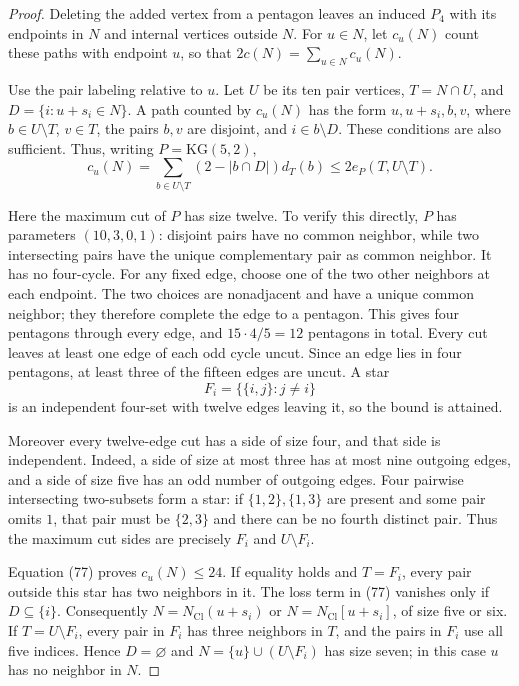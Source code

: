 \begin{proof}
Deleting the added vertex from a pentagon leaves an induced $P_4$ with
its endpoints in $N$ and internal vertices outside $N$. For $u\in N$,
let $c_u(N)$ count these paths with endpoint $u$, so that
$2c(N)=\sum_{u\in N}c_u(N)$.

Use the pair labeling relative to $u$. Let $U$ be its ten pair vertices,
$T=N\cap U$, and $D=\{i:u+s_i\in N\}$. A path counted by $c_u(N)$
has the form $u,u+s_i,b,v$, where $b\in U\setminus T$, $v\in T$, the
pairs $b,v$ are disjoint, and $i\in b\setminus D$. These conditions
are also sufficient. Thus, writing $P=\mathrm{KG}(5,2)$,
\begin{equation}\tag{77}\label{eq:neighborhood-path-count}
 c_u(N)=\sum_{b\in U\setminus T}(2-|b\cap D|)d_T(b)
   \leq2e_P(T,U\setminus T).
\end{equation}

Here the maximum cut of $P$ has size twelve. To verify this directly,
$P$ has parameters $(10,3,0,1)$: disjoint pairs have no common
neighbor, while two intersecting pairs have the unique complementary
pair as common neighbor. It has no four-cycle. For any fixed edge,
choose one of the two other neighbors at each endpoint. The two choices
are nonadjacent and have a unique common neighbor; they therefore
complete the edge to a pentagon. This gives four pentagons through
every edge, and $15\cdot4/5=12$ pentagons in total. Every cut leaves
at least one edge of each odd cycle uncut. Since an edge lies in four
pentagons, at least three of the fifteen edges are uncut. A star
\[
 F_i=\{\{i,j\}:j\ne i\}
\]
is an independent four-set with twelve edges leaving it, so the bound
is attained.

Moreover every twelve-edge cut has a side of size four, and that side
is independent. Indeed, a side of size at most three has at most nine
outgoing edges, and a side of size five has an odd number of outgoing
edges. Four pairwise intersecting two-subsets form a star: if
$\{1,2\},\{1,3\}$ are present and some pair omits $1$, that pair must
be $\{2,3\}$ and there can be no fourth distinct pair. Thus the
maximum cut sides are precisely $F_i$ and $U\setminus F_i$.

Equation (77) proves $c_u(N)\leq24$. If equality holds and $T=F_i$,
every pair outside this star has two neighbors in it. The loss term in
(77) vanishes only if $D\subseteq\{i\}$. Consequently
$N=N_{\mathrm{Cl}}(u+s_i)$ or $N=N_{\mathrm{Cl}}[u+s_i]$, of size five
or six. If $T=U\setminus F_i$, every pair in $F_i$ has three neighbors
in $T$, and the pairs in $F_i$ use all five indices. Hence
$D=\varnothing$ and $N=\{u\}\cup(U\setminus F_i)$ has size seven;
in this case $u$ has no neighbor in $N$.


\end{proof}
